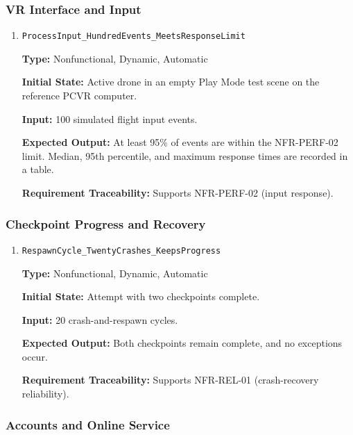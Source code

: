 \documentclass[12pt, titlepage]{article}
\begin{document}
\subsubsection{VR Interface and Input}

\begin{enumerate}

\item \texttt{ProcessInput\_HundredEvents\_MeetsResponseLimit}

\textbf{Type:} Nonfunctional, Dynamic, Automatic

\textbf{Initial State:} Active drone in an empty Play Mode test scene on the reference PCVR computer.

\textbf{Input:} 100 simulated flight input events.

\textbf{Expected Output:} At least 95\% of events are within the NFR-PERF-02 limit. Median, 95th percentile, and maximum response times are recorded in a table.

{\sloppy\textbf{Requirement Traceability:} Supports NFR-PERF-02 (input response).\par}

\end{enumerate}

\subsubsection{Checkpoint Progress and Recovery}

\begin{enumerate}

\item \texttt{RespawnCycle\_TwentyCrashes\_KeepsProgress}

\textbf{Type:} Nonfunctional, Dynamic, Automatic

\textbf{Initial State:} Attempt with two checkpoints complete.

\textbf{Input:} 20 crash-and-respawn cycles.

\textbf{Expected Output:} Both checkpoints remain complete, and no exceptions occur.

{\sloppy\textbf{Requirement Traceability:} Supports NFR-REL-01 (crash-recovery reliability).\par}

\end{enumerate}

\subsubsection{Accounts and Online Service}
\end{document}
